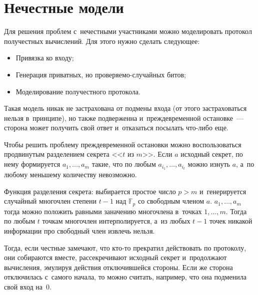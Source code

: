 \documentclass{article}
\begin{document}
\section{Нечестные модели}

Для решения проблем с~нечестными участниками можно моделировать протокол
получестных вычислений. Для этого нужно сделать следующее:
\begin{itemize}
	\item Привязка ко входу;
	\item Генерация приватных, но проверяемо-случайных битов;
	\item Моделирование получестного протокола.
\end{itemize}

Такая модель никак не застрахована от подмены входа (от этого застраховаться
нельзя в~принципе), но также подверженна и~преждевременной остановке~--- сторона
может получить свой ответ и~отказаться посылать что-либо еще.

Чтобы решить проблему преждевременной остановки можно воспользоваться
продвинутым разделением секрета <<$t$ из $m$>>. Если $a$ исходный секрет, по
нему формируется $a_1, \ldots, a_m$ такие, что по любым $a_{i_1}, \ldots,
a_{i_t}$ можно изнуть $a$, а~по любому меньшему количеству невозможно.

Функция разделения секрета: выбирается простое число $p > m$ и~генерируется
случайный многочлен степени $t-1$ над $\mathbb{F}_p$ со свободным членом $a$.
$a_1, \ldots, a_m$ тогда можно положить равными заначению многочлена в~точках
$1, \ldots, m$. Тогда по любым $t$ точкам многочлен интерполируется, а~из любых
$t-1$ точек никакой информации про свободный член извлечь нельзя.

Тогда, если честные замечают, что кто-то прекратил действовать по
протоколу, они собираются вместе, рассекречивают исходный секрет и~продолжают
вычисления, эмулируя действия отключившейся стороны. Если же сторона отключилась
с~самого начала, то можно считать, например, что она подменила свой вход на~0.
\end{document}
